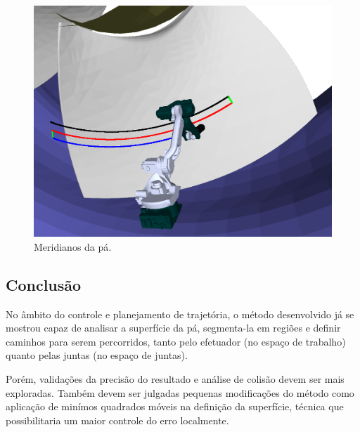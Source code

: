 \begin{figure}[!ht]
	\centering
	\includegraphics[width=\columnwidth]{method/figs/planejamento/meridianos.png}
	\caption{Meridianos da pá.}
	\label{fig::meridianos}
\end{figure}

\subsection{Conclusão}

No âmbito do controle e planejamento de trajetória, o método desenvolvido já se
mostrou capaz de analisar a superfície da pá, segmenta-la em regiões e definir
caminhos para serem percorridos, tanto pelo efetuador (no espaço de trabalho)
quanto pelas juntas (no espaço de juntas).

Porém, validações da precisão do resultado e análise de colisão devem ser mais
exploradas. Também devem ser julgadas pequenas modificações do método como
aplicação de minímos quadrados móveis na definição da superfície, técnica 
que possibilitaria um maior controle do erro localmente.